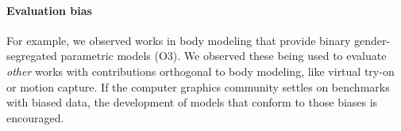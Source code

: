 \documentclass[nonacm,sigconf,review,balance=false]{acmart}
\begin{document}


\paragraph*{Evaluation bias} For example, we observed works in body modeling that provide binary gender-segregated parametric models (O3). We observed these being used to evaluate \emph{other} works with contributions orthogonal to body modeling, like virtual try-on or motion capture. If the computer graphics community settles on benchmarks with biased data, the development of models that conform to those biases is encouraged.

\end{document}
